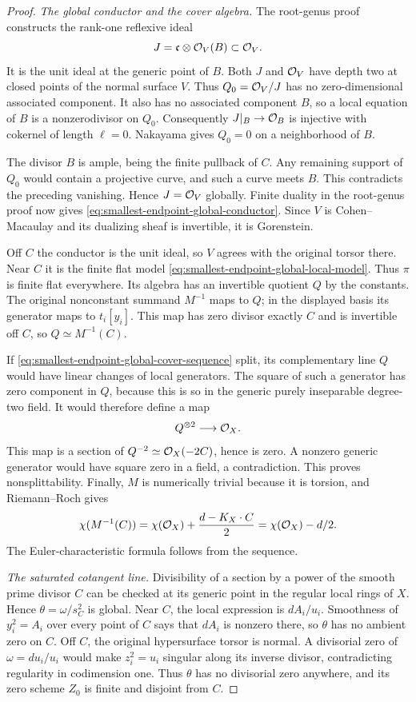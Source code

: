 \begin{proof}
\smallskip\noindent
\emph{The global conductor and the cover algebra.}
The root-genus proof constructs the rank-one reflexive ideal
\[
 J=\mathfrak c\otimes\mathcal O_V(B)\subset\mathcal O_V.
\]
It is the unit ideal at the generic point of $B$.  Both $J$ and
$\mathcal O_V$ have depth two at closed points of the normal surface $V$.
Thus $Q_0=\mathcal O_V/J$ has no zero-dimensional associated component.
It also has no associated component $B$, so a local equation of
$B$ is a nonzerodivisor on $Q_0$.  Consequently
$J|_B\to\mathcal O_B$ is injective with cokernel of length $\ell=0$.
Nakayama gives $Q_0=0$ on a neighborhood of $B$.

The divisor $B$ is ample, being the finite pullback of $C$.
Any remaining support of $Q_0$ would contain a projective curve,
and such a curve meets $B$.  This contradicts the preceding
vanishing.  Hence $J=\mathcal O_V$ globally.
Finite duality in the root-genus proof now gives
\eqref{eq:smallest-endpoint-global-conductor}.
Since $V$ is Cohen--Macaulay and its dualizing sheaf is invertible,
it is Gorenstein.

Off $C$ the conductor is the unit ideal, so $V$ agrees with the
original torsor there.  Near $C$ it is the finite flat model
\eqref{eq:smallest-endpoint-global-local-model}.  Thus $\pi$ is
finite flat everywhere.  Its algebra has an invertible quotient
$Q$ by the constants.  The original nonconstant summand $M^{-1}$
maps to $Q$; in the displayed basis its generator maps to
$t_i[y_i]$.  This map has zero divisor exactly $C$ and is invertible
off $C$, so $Q\simeq M^{-1}(C)$.

If \eqref{eq:smallest-endpoint-global-cover-sequence} split, its
complementary line $Q$ would have linear changes of local generators.
The square of such a generator has zero component in $Q$, because
this is so in the generic purely inseparable degree-two field.
It would therefore define a map
\[
 Q^{\otimes2}\longrightarrow\mathcal O_X.
\]
This map is a section of $Q^{-2}\simeq\mathcal O_X(-2C)$, hence is zero.
A nonzero generic generator would have square zero in a field,
a contradiction.  This proves nonsplittability.  Finally, $M$ is
numerically trivial because it is torsion, and Riemann--Roch gives
\[
 \chi(M^{-1}(C))
 =\chi(\mathcal O_X)+\frac{d-K_X\cdot C}{2}
 =\chi(\mathcal O_X)-d/2.
\]
The Euler-characteristic formula follows from the sequence.

\smallskip\noindent
\emph{The saturated cotangent line.}
Divisibility of a section by a power of the smooth prime divisor
$C$ can be checked at its generic point in the regular local rings
of $X$.  Hence $\theta=\omega/s_C^2$ is global.
Near $C$, the local expression is $dA_i/u_i$.
Smoothness of $y_i^2=A_i$ over every point of $C$ says that $dA_i$
is nonzero there, so $\theta$ has no ambient zero on $C$.
Off $C$, the original hypersurface torsor is normal.
A divisorial zero of $\omega=du_i/u_i$ would make $z_i^2=u_i$
singular along its inverse divisor, contradicting regularity in
codimension one.  Thus $\theta$ has no divisorial zero anywhere,
and its zero scheme $Z_0$ is finite and disjoint from $C$.


\end{proof}
